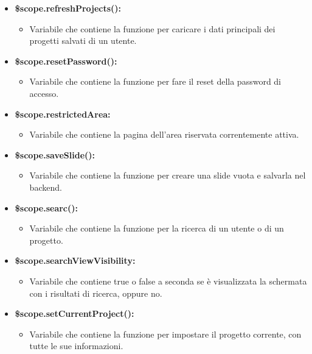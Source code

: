 \begin{itemize}
	\item \textbf{\$scope.refreshProjects():}
	\begin{itemize}
		\item Variabile che contiene la funzione per caricare i dati principali dei progetti salvati di un utente.
	\end{itemize}
	
	\item \textbf{\$scope.resetPassword():}
	\begin{itemize}
		\item Variabile che contiene la funzione per fare il reset della password di accesso.
	\end{itemize}
	
	\item \textbf{\$scope.restrictedArea:}
	\begin{itemize}
		\item Variabile che contiene la pagina dell'area riservata correntemente attiva.
	\end{itemize}
	
	\item \textbf{\$scope.saveSlide():}
	\begin{itemize}
		\item Variabile che contiene la funzione per creare una slide vuota e salvarla nel backend.
	\end{itemize}
	
	\item \textbf{\$scope.searc():}
	\begin{itemize}
		\item Variabile che contiene la funzione per la ricerca di un utente o di un progetto.
	\end{itemize}
	
	\item \textbf{\$scope.searchViewVisibility:}
	\begin{itemize}
		\item Variabile che contiene true o false a seconda se è visualizzata la schermata con i risultati di ricerca, oppure no.
	\end{itemize}
	
	\item \textbf{\$scope.setCurrentProject():}
	\begin{itemize}
		\item Variabile che contiene la funzione per impostare il progetto corrente, con tutte le sue informazioni.
	\end{itemize}
	

\end{itemize}
